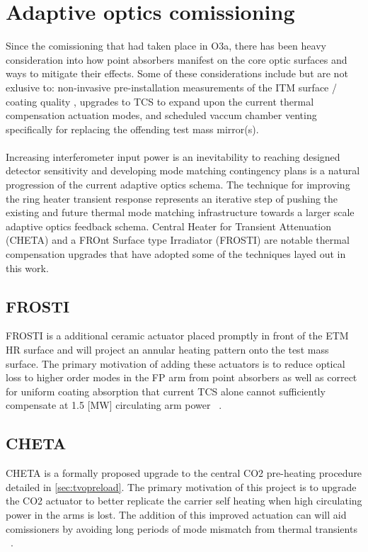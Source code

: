 
\section{Adaptive optics comissioning}
Since the comissioning that had taken place in O3a, there has been heavy consideration into how point absorbers manifest on the core optic surfaces and ways to mitigate their effects. Some of these considerations include but are not exlusive to: non-invasive pre-installation measurements of the ITM surface / coating quality \cite{dcc:paNSFupdate2022}, upgrades to TCS to expand upon the current thermal compensation actuation modes, and scheduled vaccum chamber venting specifically for replacing the offending test mass mirror(s). 
\\
\\
Increasing interferometer input power is an inevitability to reaching designed detector sensitivity and developing mode matching contingency plans is a natural progression of the current adaptive optics schema. The technique for improving the ring heater transient response represents an iterative step of pushing the existing and future thermal mode matching infrastructure towards a larger scale adaptive optics feedback schema. Central Heater for Transient Attenuation (CHETA) and a FROnt Surface type Irradiator (FROSTI) are notable thermal compensation upgrades that have adopted some of the techniques layed out in this work.

\subsection*{FROSTI} 
FROSTI is a additional ceramic actuator placed promptly in front of the ETM HR surface and will project an annular heating pattern onto the test mass surface. The primary motivation of adding these actuators is to reduce optical loss to higher order modes in the FP arm from point absorbers as well as correct for uniform coating absorption that current TCS alone cannot sufficiently compensate at 1.5 [MW] circulating arm power ~\cite{frosti}.

\subsection*{CHETA}
CHETA is a formally proposed upgrade to the central CO2 pre-heating procedure detailed in \autoref{sec:tvopreload}. The primary motivation of this project is to upgrade the CO2 actuator to better replicate the carrier self heating when high circulating power in the arms is lost. The addition of this improved actuation can will aid comissioners by avoiding long periods of mode mismatch from thermal transients ~\cite{cheta}. 

